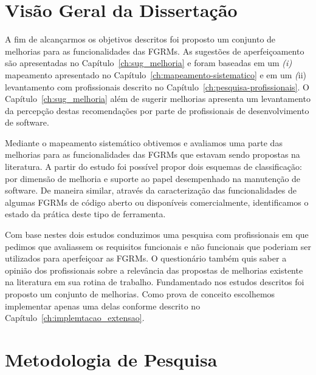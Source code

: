 
\section{Visão Geral da Dissertação}
\label{sec:intro-visao-geral}

A fim de alcançarmos os objetivos descritos foi proposto um conjunto de
melhorias para as funcionalidades das FGRMs. As sugestões de aperfeiçoamento são
apresentadas no Capítulo~\ref{ch:sug_melhoria} e foram baseadas em um
\textit{(i)} mapeamento apresentado no Capítulo~\ref{ch:mapeamento-sistematico}
e em um \textit(ii) levantamento com profissionais descrito no
Capítulo~\ref{ch:pesquisa-profissionais}. O Capítulo~\ref{ch:sug_melhoria} além
de sugerir melhorias apresenta um levantamento da percepção destas recomendações
por parte de profissionais de desenvolvimento de software.

Mediante o mapeamento sistemático obtivemos e avaliamos uma parte das melhorias
para as funcionalidades das FGRMs que estavam sendo propostas na literatura. A
partir do estudo foi possível propor dois esquemas de classificação: por
dimensão de melhoria e suporte ao papel desempenhado na manutenção de software.
De maneira similar, através da caracterização das funcionalidades de algumas
FGRMs de código aberto ou disponíveis comercialmente, identificamos o estado da
prática deste tipo de ferramenta.

Com base nestes dois estudos conduzimos uma pesquisa com profissionais em que
pedimos que avaliassem os requisitos funcionais e não funcionais que poderiam
ser utilizados para aperfeiçoar as FGRMs. O questionário também quis saber a
opinião dos profissionais sobre a relevância das propostas de me\-lho\-ri\-as
existente na literatura em sua rotina de trabalho. Fundamentado nos estudos
descritos foi proposto um conjunto de melhorias. Como prova de conceito
escolhemos implementar apenas uma delas conforme descrito no
Capítulo~\ref{ch:implemtacao_extensao}.

\section{Metodologia de Pesquisa}
\label{sec:intro-metodologia}

